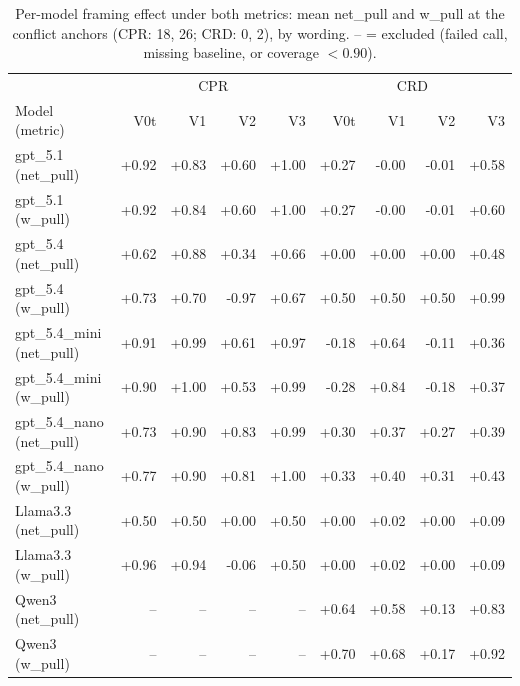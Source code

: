 \begin{table}[t]
\centering
\caption{Per-model framing effect under both metrics: mean net\_pull and w\_pull at the conflict anchors (CPR: 18, 26; CRD: 0, 2), by wording. -- = excluded (failed call, missing baseline, or coverage $<0.90$).}
\label{tab:framing_permodel_wpull}
\small
\begin{tabular}{lrrrrrrrr}
\toprule
 & \multicolumn{4}{c}{CPR} & \multicolumn{4}{c}{CRD} \\
Model (metric) & V0t & V1 & V2 & V3 & V0t & V1 & V2 & V3 \\
\midrule
gpt\_5.1 (net\_pull) & +0.92 & +0.83 & +0.60 & +1.00 & +0.27 & -0.00 & -0.01 & +0.58 \\
gpt\_5.1 (w\_pull) & +0.92 & +0.84 & +0.60 & +1.00 & +0.27 & -0.00 & -0.01 & +0.60 \\
gpt\_5.4 (net\_pull) & +0.62 & +0.88 & +0.34 & +0.66 & +0.00 & +0.00 & +0.00 & +0.48 \\
gpt\_5.4 (w\_pull) & +0.73 & +0.70 & -0.97 & +0.67 & +0.50 & +0.50 & +0.50 & +0.99 \\
gpt\_5.4\_mini (net\_pull) & +0.91 & +0.99 & +0.61 & +0.97 & -0.18 & +0.64 & -0.11 & +0.36 \\
gpt\_5.4\_mini (w\_pull) & +0.90 & +1.00 & +0.53 & +0.99 & -0.28 & +0.84 & -0.18 & +0.37 \\
gpt\_5.4\_nano (net\_pull) & +0.73 & +0.90 & +0.83 & +0.99 & +0.30 & +0.37 & +0.27 & +0.39 \\
gpt\_5.4\_nano (w\_pull) & +0.77 & +0.90 & +0.81 & +1.00 & +0.33 & +0.40 & +0.31 & +0.43 \\
Llama3.3 (net\_pull) & +0.50 & +0.50 & +0.00 & +0.50 & +0.00 & +0.02 & +0.00 & +0.09 \\
Llama3.3 (w\_pull) & +0.96 & +0.94 & -0.06 & +0.50 & +0.00 & +0.02 & +0.00 & +0.09 \\
Qwen3 (net\_pull) & -- & -- & -- & -- & +0.64 & +0.58 & +0.13 & +0.83 \\
Qwen3 (w\_pull) & -- & -- & -- & -- & +0.70 & +0.68 & +0.17 & +0.92 \\
\bottomrule
\end{tabular}
\end{table}
